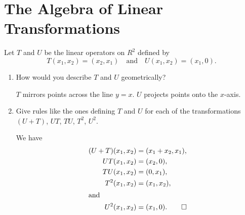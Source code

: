 \section{The Algebra of Linear Transformations}

 Let $T$ and $U$ be the linear operators on $R^2$ defined by
\begin{equation*}
  T(x_1,x_2) = (x_2,x_1) \quad\text{and}\quad
  U(x_1,x_2) = (x_1,0).
\end{equation*}
\begin{enumerate}
\item How would you describe $T$ and $U$ geometrically?
  \begin{solution}
    $T$ mirrors points across the line $y = x$. $U$ projects points
    onto the $x$-axis.
  \end{solution}

\item Give rules like the ones defining $T$ and $U$ for each of the
  transformations $(U + T)$, $UT$, $TU$, $T^2$, $U^2$.
  \begin{solution}
    We have
    \begin{align*}
      (U + T)(x_1,x_2) &= (x_1 + x_2, x_1), \\
      UT(x_1,x_2) &= (x_2, 0), \\
      TU(x_1,x_2) &= (0, x_1), \\
      T^2(x_1,x_2) &= (x_1,x_2), \\
      \intertext{and}
      U^2(x_1,x_2) &= (x_1,0). \qedhere
    \end{align*}
  \end{solution}
\end{enumerate}
